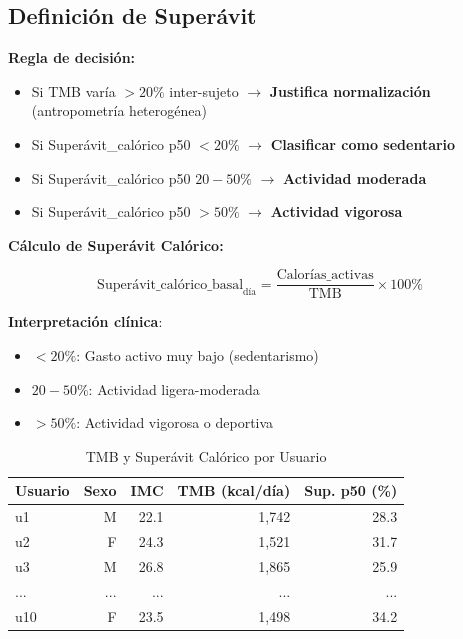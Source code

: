 \documentclass[12pt,letterpaper,twoside]{report}
\begin{document}
\subsection{Definición de Superávit}

\begin{reglabox}
\textbf{Regla de decisión:}

\begin{itemize}[noitemsep]
    \item Si TMB varía $>20\%$ inter-sujeto $\to$ \textbf{Justifica normalización} (antropometría heterogénea)
    \item Si Superávit\_calórico p50 $<20\%$ $\to$ \textbf{Clasificar como sedentario}
    \item Si Superávit\_calórico p50 $20-50\%$ $\to$ \textbf{Actividad moderada}
    \item Si Superávit\_calórico p50 $>50\%$ $\to$ \textbf{Actividad vigorosa}
\end{itemize}
\end{reglabox}

\begin{calculobox}
\textbf{Cálculo de Superávit Calórico:}

\begin{equation}
\text{Superávit\_calórico\_basal}_{\text{día}} = \frac{\text{Calorías\_activas}}{\text{TMB}} \times 100\%
\end{equation}

\textbf{Interpretación clínica}:
\begin{itemize}[noitemsep]
    \item $<20\%$: Gasto activo muy bajo (sedentarismo)
    \item $20-50\%$: Actividad ligera-moderada
    \item $>50\%$: Actividad vigorosa o deportiva
\end{itemize}
\end{calculobox}

\begin{table}[H]
\centering
\caption{TMB y Superávit Calórico por Usuario}
\label{tab:tmb_surplus}
\begin{tabular}{@{}lrrrr@{}}
\toprule
\textbf{Usuario} & \textbf{Sexo} & \textbf{IMC} & \textbf{TMB (kcal/día)} & \textbf{Sup. p50 (\%)} \\
\midrule
u1  & M & 22.1 & 1,742 & 28.3 \\
u2  & F & 24.3 & 1,521 & 31.7 \\
u3  & M & 26.8 & 1,865 & 25.9 \\
... & ...& ... & ... & ... \\
u10 & F & 23.5 & 1,498 & 34.2 \\
\bottomrule
\end{tabular}
\end{table}
\end{document}
